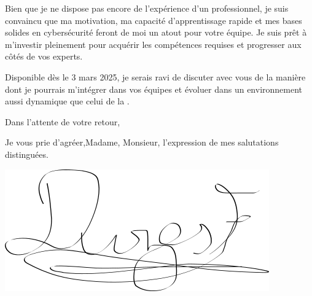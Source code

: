 \begin{large}
\begin{justify}
Bien que je ne dispose pas encore de l’expérience d'un professionnel, je suis convaincu que ma motivation, ma capacité d’apprentissage rapide et mes bases solides en cybersécurité feront de moi un atout pour votre équipe. Je suis prêt à m’investir pleinement pour acquérir les compétences requises et progresser aux côtés de vos experts. \medbreak 

Disponible dès le 3 mars 2025, je serais ravi de discuter avec vous de la manière dont je pourrais m’intégrer dans vos équipes et évoluer dans un environnement aussi dynamique que celui de la \entreprise. \medbreak

Dans l’attente de votre retour, \medbreak

Je vous prie d’agréer,\medbreak Madame, Monsieur, l’expression de mes salutations distinguées.



\raggedleft
\fullName\smallbreak
\includegraphics[scale=0.3]{sign.png}

\end{justify}
\end{large}